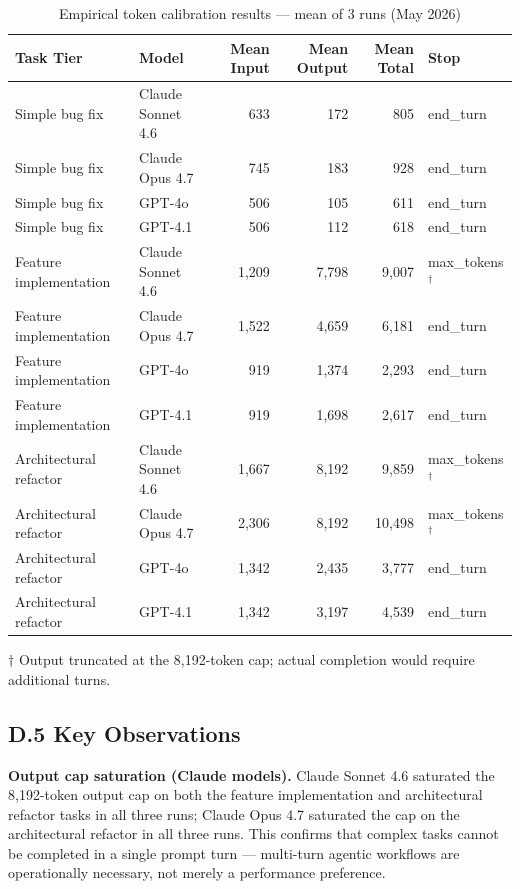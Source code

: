 \documentclass{article}
\begin{document}
\begin{table}[ht]
\centering
\caption{Empirical token calibration results --- mean of 3 runs (May 2026)}
\label{tab:calib-raw}
\small
\begin{tabular}{@{}llrrrl@{}}
\toprule
\textbf{Task Tier} & \textbf{Model} & \textbf{Mean Input} & \textbf{Mean Output} & \textbf{Mean Total} & \textbf{Stop} \\
\midrule
Simple bug fix & Claude Sonnet 4.6 & 633 & 172 & 805 & end\_turn \\
Simple bug fix & Claude Opus 4.7   & 745 & 183 & 928 & end\_turn \\
Simple bug fix & GPT-4o            & 506 & 105 & 611 & end\_turn \\
Simple bug fix & GPT-4.1           & 506 & 112 & 618 & end\_turn \\
\midrule
Feature implementation & Claude Sonnet 4.6 & 1{,}209 & 7{,}798 & 9{,}007 & max\_tokens$^\dagger$ \\
Feature implementation & Claude Opus 4.7   & 1{,}522 & 4{,}659 & 6{,}181 & end\_turn \\
Feature implementation & GPT-4o            &    919  & 1{,}374 & 2{,}293 & end\_turn \\
Feature implementation & GPT-4.1           &    919  & 1{,}698 & 2{,}617 & end\_turn \\
\midrule
Architectural refactor & Claude Sonnet 4.6 & 1{,}667 & 8{,}192 & 9{,}859 & max\_tokens$^\dagger$ \\
Architectural refactor & Claude Opus 4.7   & 2{,}306 & 8{,}192 & 10{,}498 & max\_tokens$^\dagger$ \\
Architectural refactor & GPT-4o            & 1{,}342 & 2{,}435 &  3{,}777 & end\_turn \\
Architectural refactor & GPT-4.1           & 1{,}342 & 3{,}197 &  4{,}539 & end\_turn \\
\bottomrule
\end{tabular}
\vspace{0.4em}

\raggedright
\footnotesize
$\dagger$ Output truncated at the 8{,}192-token cap; actual completion would require
additional turns.
\end{table}

\subsection*{D.5 Key Observations}

\textbf{Output cap saturation (Claude models).}
Claude Sonnet 4.6 saturated the 8{,}192-token output cap on both the feature implementation
and architectural refactor tasks in all three runs; Claude Opus 4.7 saturated the cap on
the architectural refactor in all three runs. This confirms that complex tasks cannot be
completed in a single prompt turn --- multi-turn agentic workflows are operationally
necessary, not merely a performance preference.
\end{document}
